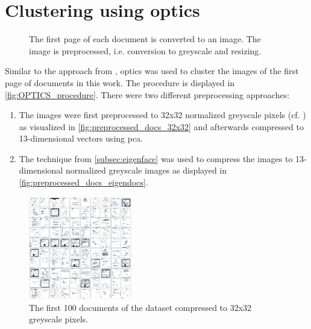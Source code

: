 \section{Clustering using \acs*{optics}}\label{sec:impl-optics}

\begin{figure}[htp] %
    \centering
    
    \caption[\ac{optics} procedure]{The first page of each document is converted to an image.
    The image is preprocessed, i.e. conversion to greyscale and resizing.
    }
    \label{fig:OPTICS_procedure}
\end{figure}

Similar to the approach from \cite{OPTICS1999}, \ac{optics} was used to cluster the images of the first page of documents in this work.
The procedure is displayed in \autoref{fig:OPTICS_procedure}.
There were two different preprocessing approaches:
\begin{enumerate}
    \item \label{pt:32}The images were first preprocessed to 32x32 normalized greyscale pixels (cf. \cite{OPTICS1999}) as visualized in \autoref{fig:preprocessed_docs_32x32}
    and afterwards compressed to 13-dimensional vectors using \ac{pca}.
    \item \label{pt:eigendocs}The technique \eigendocs{} from \autoref{subsec:eigenface} 
    was used to compress the images to 13-dimensional normalized greyscale images as displayed in \autoref{fig:preprocessed_docs_eigendocs}.
\end{enumerate}


\begin{figure}[htp] %
    \centering
    \includegraphics[width=0.4\textwidth]{images/OPTICS/32x32/preprocessed_docs.pdf}
    \caption[Preprocessing to 32x32 normalized greyscale pixels]{The first 100 documents of the dataset compressed to 32x32 greyscale pixels.
    }
    \label{fig:preprocessed_docs_32x32}
\end{figure}

